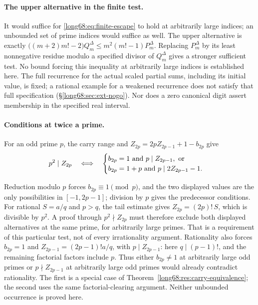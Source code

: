 \documentclass[11pt]{article}
\newcommand{\Ser}{S}
\begin{document}
\paragraph{The upper alternative in the finite test.}
It would suffice for \eqref{long68:eq:finite-escape} to hold at arbitrarily
large indices; an unbounded set of prime indices would suffice as well.  The upper alternative is exactly
$\bigl((m+2)m!-2\bigr)Q^\Delta_m\le m^2(m!-1)P^\Delta_m$.  Replacing $P^\Delta_m$ by its least
nonnegative residue modulo a specified divisor of $Q^\Delta_m$ gives a stronger
sufficient test. No bound forcing this inequality at arbitrarily large
indices is established here. The full recurrence for the actual scaled
partial sums, including its initial value, is fixed; a rational example
for a weakened recurrence does not satisfy that full specification
(\S\ref{long68:sec:ext-nogo}). Nor does a zero canonical digit assert
membership in the specified real interval.

\paragraph{Conditions at twice a prime.}
For an odd prime $p$, the carry range and $Z_{2p}=2pZ_{2p-1}+1-b_{2p}$ give
\begin{equation}\label{long68:eq:doubled-prime}
 p^2\mid Z_{2p}
 \quad\Longleftrightarrow\quad
 \begin{cases}
 b_{2p}=1\ \hbox{and}\ p\mid Z_{2p-1},\ \hbox{or}\\
 b_{2p}=1+p\ \hbox{and}\ p\mid2Z_{2p-1}-1 .
 \end{cases}
\end{equation}


Reduction modulo $p$ forces $b_{2p}\equiv1\pmod p$, and the two displayed
values are the only possibilities in $[-1,2p-1]$; division by $p$ gives the
predecessor conditions.  For rational $\Ser=a/q$ and $p>q$, the tail estimate gives
$Z_{2p}=(2p)!\,\Ser$, which is divisible by $p^2$. A proof through
$p^2\nmid Z_{2p}$ must therefore exclude both displayed alternatives at
the same prime, for arbitrarily large primes.
That is a requirement of this particular test, not of every irrationality
argument. Rationality also forces $b_{2p}=1$ and
$Z_{2p-1}=(2p-1)!a/q$, with $p\mid Z_{2p-1}$: here $q\mid(p-1)!$,
and the remaining factorial factors include $p$. Thus either
$b_{2p}\ne1$ at arbitrarily large odd primes or
$p\nmid Z_{2p-1}$ at arbitrarily large odd primes would already contradict
rationality. The first is a special case of
Theorem~\ref{long68:res:carry-equivalence}; the second uses the same
factorial-clearing argument. Neither unbounded occurrence is proved here.
\end{document}
